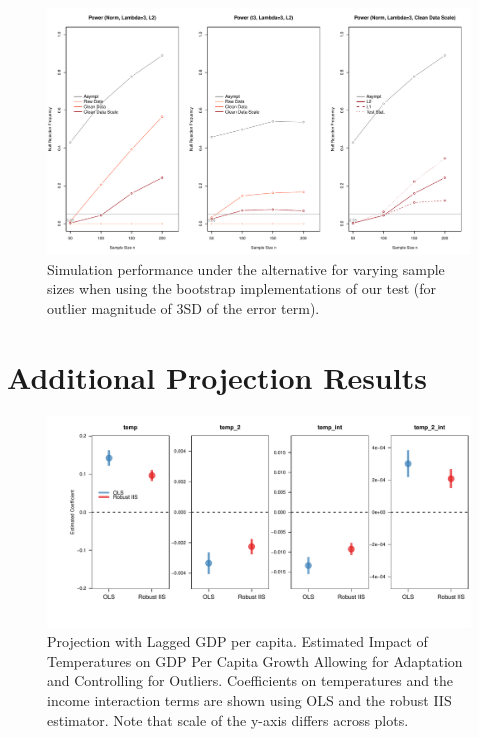 \documentclass[11pt, letterpaper]{article}
\numberwithin{algorithm}{section}
\numberwithin{assumption}{section}
\numberwithin{lemma}{section}
\numberwithin{theorem}{section}
\numberwithin{corollary}{section}
\numberwithin{remark}{section}
\numberwithin{equation}{section}
\numberwithin{figure}{section}
\numberwithin{table}{section}
\begin{document}
\begin{figure}[!htbp]  %
\centering
\includegraphics[scale=0.5]{boot_alt_lambda3.pdf}
\caption{Simulation performance under the alternative for varying sample sizes when using the bootstrap implementations of our test (for outlier magnitude of 3SD of the error term).}
\label{fig_out_sim_alt_boot3}
\end{figure}



\section{Additional Projection Results} \label{sec_add_proj}


\begin{figure}[!htbp]  %
\centering
\includegraphics[width = \textwidth]{coef.adapt.L1.pdf}
\caption{Projection with Lagged GDP per capita. Estimated Impact of Temperatures on GDP Per Capita Growth Allowing for Adaptation and Controlling for Outliers. Coefficients on temperatures and the income interaction terms are shown using OLS and the robust IIS estimator. Note that scale of the y-axis differs across plots.}
\label{fig_dist_coef_app1}
\end{figure}
\end{document}
